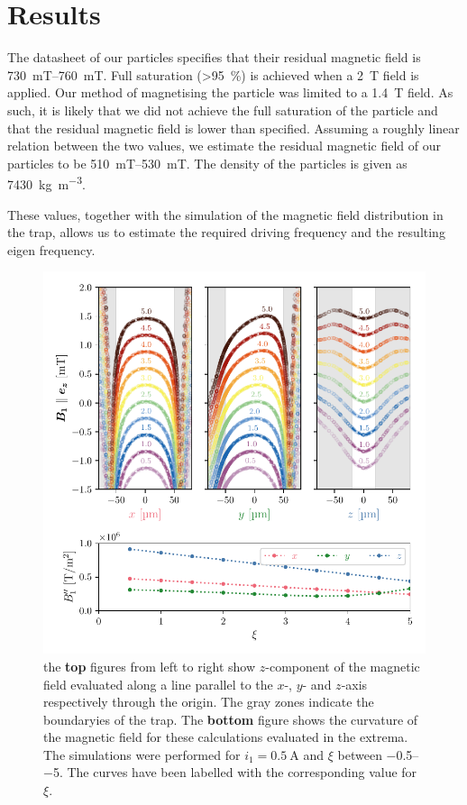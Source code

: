 \chapter{Results}
\label{chap:results}
The datasheet of our  particles specifies that their residual magnetic field is \qtyrange{730}{760}{\milli\tesla}. Full saturation (\qty{>95}{\percent}) is achieved when a \qty{2}{\tesla} field is applied. Our method of magnetising the particle was limited to a \qty{1.4}{\tesla} field. As such, it is likely that we did not achieve the full saturation of the particle and that the residual magnetic field is lower than specified. Assuming a roughly linear relation between the two values, we estimate the residual magnetic field of our particles to be \qtyrange{510}{530}{\milli\tesla}. The density of the particles is given as \qty{7430}{\kilo\gram\per\cubic\meter}.

These values, together with the simulation of the magnetic field distribution in the trap, allows us to estimate the required driving frequency and the resulting eigen frequency.

\begin{figure}
    \centering
    \includegraphics{figures/magnetic_field_curvature.pdf}
    \caption{the \textbf{top} figures from left to right show $z$-component of the magnetic field evaluated along a line parallel to the $x$-, $y$- and $z$-axis respectively through the origin. The gray zones indicate the boundaryies of the trap. The \textbf{bottom} figure shows the curvature of the magnetic field for these calculations evaluated in the extrema. The simulations were performed for $i_1=\qty{0.5}{\ampere}$ and $\xi$ between \numrange{-0.5}{-5}. The curves have been labelled with the corresponding value for $\xi$.}
\end{figure}

